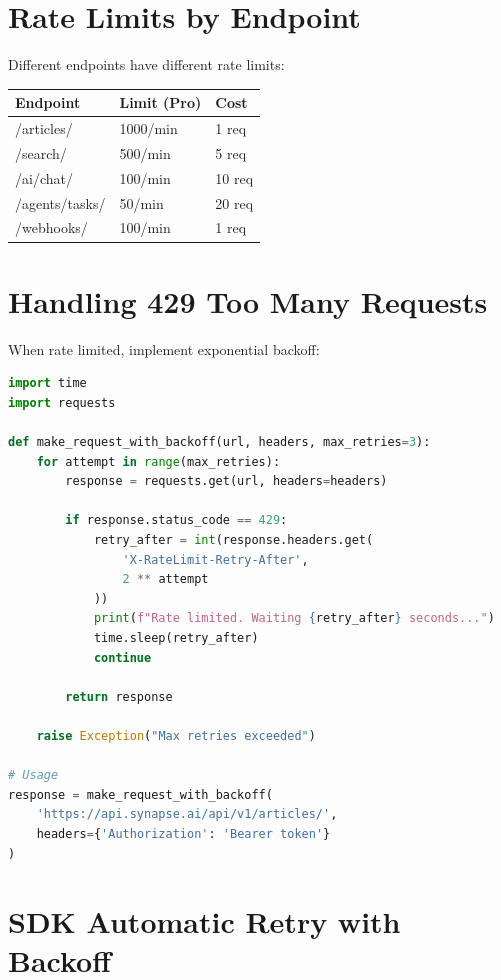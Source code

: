 \documentclass{report}
\begin{document}
\section{Rate Limits by Endpoint}

Different endpoints have different rate limits:

\begin{center}
\begin{tabular}{lll}
\toprule
\textbf{Endpoint} & \textbf{Limit (Pro)} & \textbf{Cost} \\
\midrule
/articles/ & 1000/min & 1 req \\
/search/ & 500/min & 5 req \\
/ai/chat/ & 100/min & 10 req \\
/agents/tasks/ & 50/min & 20 req \\
/webhooks/ & 100/min & 1 req \\
\bottomrule
\end{tabular}
\end{center}

\section{Handling 429 Too Many Requests}

When rate limited, implement exponential backoff:

\begin{lstlisting}[language=Python]
import time
import requests

def make_request_with_backoff(url, headers, max_retries=3):
    for attempt in range(max_retries):
        response = requests.get(url, headers=headers)
        
        if response.status_code == 429:
            retry_after = int(response.headers.get(
                'X-RateLimit-Retry-After', 
                2 ** attempt
            ))
            print(f"Rate limited. Waiting {retry_after} seconds...")
            time.sleep(retry_after)
            continue
        
        return response
    
    raise Exception("Max retries exceeded")

# Usage
response = make_request_with_backoff(
    'https://api.synapse.ai/api/v1/articles/',
    headers={'Authorization': 'Bearer token'}
)
\end{lstlisting}

\section{SDK Automatic Retry with Backoff}
\end{document}
